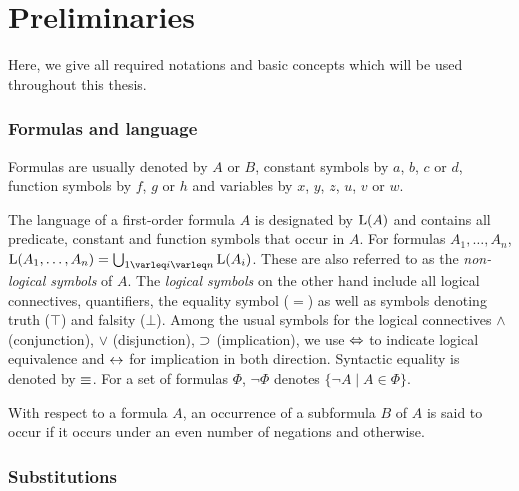 \section{Preliminaries}
\label{sec:preliminaries}

Here, we give all required notations and basic concepts which will be used throughout this thesis.

\subsubsection*{Formulas and language}

Formulas are usually denoted by $A$ or $B$, constant symbols by $a$, $b$, $c$ or $d$, function symbols by $f$, $g$ or $h$ and variables by $x$, $y$, $z$, $u$, $v$ or $w$.

The language of a first-order formula $A$ is designated by $\operatorname{L}(A)$ and contains all predicate, constant and function symbols that occur in $A$.
For formulas $A_1, \ldots, A_n$, $\Lang(A_1, \ldots, A_n) = \bigcup_{1\varleq i \varleq n} \Lang(A_i)$.
These are also referred to as the \emph{\mbox{non-logical} symbols} of $A$.
The \emph{logical symbols} on the other hand include all logical connectives, quantifiers, the equality symbol ($=$) as well as symbols denoting truth ($\top$) and falsity ($\bot$).
Among the usual symbols for the logical connectives $\land$ (conjunction), $\lor$ (disjunction), $\operatorname{\supset}$ (implication), we use $\operatorname{\Leftrightarrow}$ to indicate logical equivalence and $\operatorname{\leftrightarrow}$ for implication in both direction.
Syntactic equality is denoted by $\equiv$.
For a set of formulas $\Phi$, $\lnot \Phi$ denotes $\{\lnot A \mid A \in \Phi\}$.



With respect to a formula\nolinebreak{} $A$, an occurrence of a subformula $B$ of $A$ is said to occur  if it occurs under an even number of negations and  otherwise.





\subsubsection*{Substitutions}


